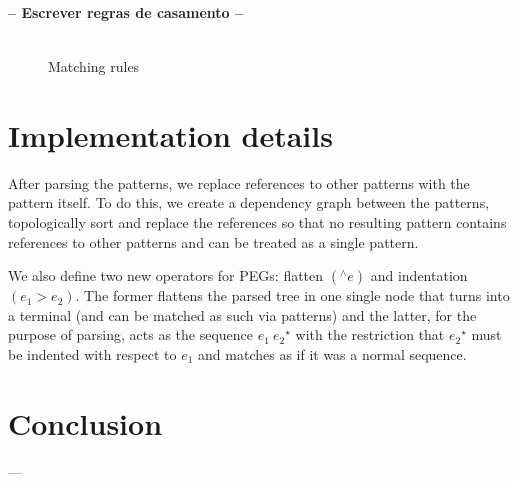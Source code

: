 \textbf{-- Escrever regras de casamento --}
\begin{figure*}[ht]
    \[
        \begin{array}{ccc}








        \end{array}
    \]
    \centering
    \caption{Matching rules}
    \label{fig:matching-rules}
\end{figure*}

\section{Implementation details}\label{sec:implementation-details}

After parsing the patterns, we replace references to other patterns with the
pattern itself. To do this, we create a dependency graph between the patterns,
topologically sort and replace the references so that no resulting pattern
contains references to other patterns and can be treated as a single pattern.

We also define two new operators for PEGs: flatten \((^\wedge e)\) and indentation
\((e_1 > e_2)\). The former flattens the parsed tree in one single node that turns
into a terminal (and can be matched as such via patterns) and the latter, for the
purpose of parsing, acts as the sequence \(e_1\:{e_2}^\star\) with the restriction
that \({e_2}^\star\) must be indented with respect to \(e_1\) and matches as if it
was a normal sequence.

\section{Conclusion}\label{sec:methodology-conclusion}

---

\cleardoublepage
